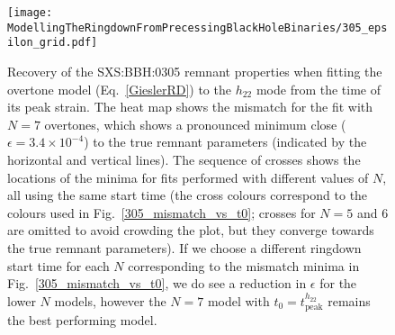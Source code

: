 \begin{figure}[t]
    \centering
    \texttt{[image: ModellingTheRingdownFromPrecessingBlackHoleBinaries/305\_epsilon\_grid.pdf]}
    \caption[Recovery of the SXS:BBH:0305 remnant properties using an overtone model starting from the peak of the $h_{22}$ strain]{ 
    Recovery of the SXS:BBH:0305 remnant properties when fitting the overtone model (Eq.~\ref{GieslerRD}) to the $h_{22}$ mode from the time of its peak strain.
    The heat map shows the mismatch for the fit with $N=7$ overtones, which shows a pronounced minimum close ($\epsilon=3.4\times 10^{-4}$) to the true remnant parameters (indicated by the horizontal and vertical lines).
    The sequence of crosses shows the locations of the minima for fits performed with different values of $N$, all using the same start time (the cross colours correspond to the colours used in Fig.~\ref{305_mismatch_vs_t0}; crosses for $N=5$ and 6 are omitted to avoid crowding the plot, but they converge towards the true remnant parameters). 
    If we choose a different ringdown start time for each $N$ corresponding to the mismatch minima in Fig.~\ref{305_mismatch_vs_t0}, we do see a reduction in $\epsilon$ for the lower $N$ models, however the $N=7$ model with $t_0=t_\mathrm{peak}^{h_{22}}$ remains the best performing model.
    } 
    \label{305_epsilon_grid}
\end{figure}

